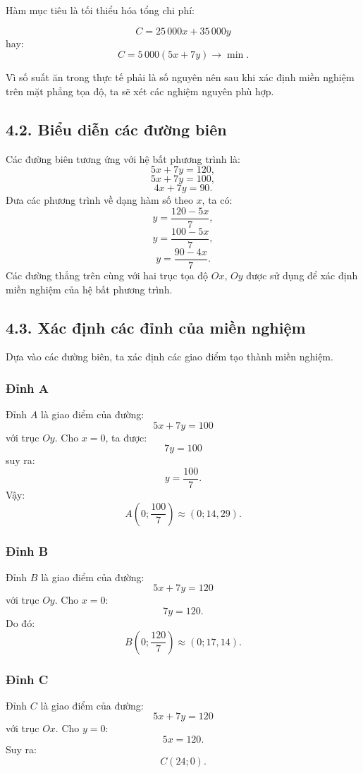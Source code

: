 \documentclass[12pt,a4paper]{article}
\begin{document}
Hàm mục tiêu là tối thiểu hóa tổng chi phí:

\[
\boxed{
C=25\,000x+35\,000y
}
\]
hay:
\[
\boxed{
C=5\,000(5x+7y)\longrightarrow\min.
}
\]

Vì số suất ăn trong thực tế phải là số nguyên nên sau khi xác định miền nghiệm trên mặt phẳng tọa độ, ta sẽ xét các nghiệm nguyên phù hợp.


\subsection*{4.2. Biểu diễn các đường biên}

Các đường biên tương ứng với hệ bất phương trình là:
\[
5x+7y=120,
\]
\[
5x+7y=100,
\]
\[
4x+7y=90.
\]
Đưa các phương trình về dạng hàm số theo $x$, ta có:
\[
y=\frac{120-5x}{7},
\]
\[
y=\frac{100-5x}{7},
\]
\[
y=\frac{90-4x}{7}.
\]
Các đường thẳng trên cùng với hai trục tọa độ $Ox$, $Oy$ được sử dụng để xác định miền nghiệm của hệ bất phương trình.


\subsection*{4.3. Xác định các đỉnh của miền nghiệm}

Dựa vào các đường biên, ta xác định các giao điểm tạo thành miền nghiệm.
\subsubsection*{Đỉnh A}
Đỉnh $A$ là giao điểm của đường:
\[
5x+7y=100
\]
với trục $Oy$.
Cho $x=0$, ta được:
\[
7y=100
\]
suy ra:
\[
y=\frac{100}{7}.
\]
Vậy:
\[
\boxed{
A\left(0;\frac{100}{7}\right)
}
\approx(0;14,29).
\]
\subsubsection*{Đỉnh B}
Đỉnh $B$ là giao điểm của đường:
\[
5x+7y=120
\]
với trục $Oy$.
Cho $x=0$:
\[
7y=120.
\]
Do đó:
\[
\boxed{
B\left(0;\frac{120}{7}\right)
}
\approx(0;17,14).
\]
\subsubsection*{Đỉnh C}
Đỉnh $C$ là giao điểm của đường:
\[
5x+7y=120
\]
với trục $Ox$.
Cho $y=0$:
\[
5x=120.
\]
Suy ra:
\[
\boxed{C(24;0)}.
\]
\end{document}
